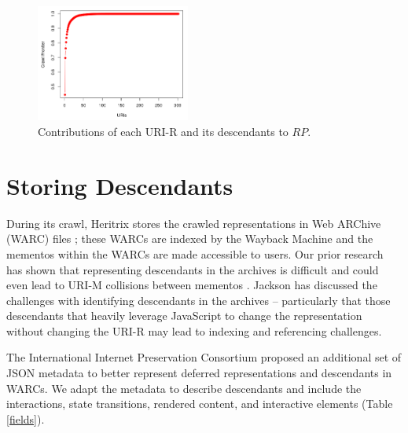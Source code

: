 \documentclass{sig-alternate}
\begin{document}
\begin{figure}
\centering
\includegraphics[width=0.45\textwidth]{./imgs/cdfURIs.png}
\caption{Contributions of each URI-R and its descendants to $RP$.}
\label{cdf}
\end{figure}



\section{Storing Descendants}
During its crawl, Heritrix stores the crawled representations in Web ARChive (WARC) files \cite{warciso}; these WARCs are indexed by the Wayback Machine and the mementos within the WARCs are made accessible to users. Our prior research has shown that representing descendants in the archives is difficult and could even lead to URI-M collisions between mementos \cite{idReps}. Jackson has discussed \cite{jacksonSopa} the challenges with identifying descendants in the archives -- particularly that those descendants that heavily leverage JavaScript to change the representation without changing the URI-R may lead to indexing and referencing challenges. 

The International Internet Preservation Consortium proposed \cite{warcrevision, warcTargets} an additional set of JSON metadata to better represent deferred representations and descendants in WARCs. We adapt the metadata to describe descendants and include the interactions, state transitions, rendered content, and interactive elements (Table \ref{fields}).
\end{document}
